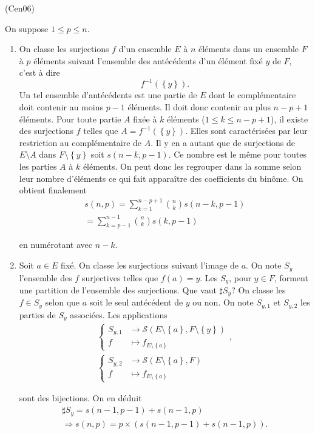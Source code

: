 \begin{tiny}(Cen06)\end{tiny} On suppose $1\leq p\leq n$. 
\begin{enumerate}
  \item On classe les surjections $f$ d'un ensemble $E$ à $n$ éléments dans un ensemble $F$ à $p$ éléments suivant l'ensemble des antécédents d'un élément fixé $y$ de $F$, c'est à dire 
\[
  f^{-1}(\left\lbrace y\right\rbrace).
\]
Un tel ensemble d'antécédents est une partie de $E$ dont le complémentaire doit contenir au moins $p-1$ éléments. Il doit donc contenir au plus $n-p+1$ éléments.\newline
Pour toute partie $A$ fixée à $k$ éléments ($1 \leq k\leq n-p+1$), il existe des surjections $f$ telles que $ A= f^{-1}(\left\lbrace y\right\rbrace)$. Elles sont caractérisées par leur restriction au complémentaire de $A$. Il y en a autant que de surjections de $E\setminus A$ dans $F\setminus\left\lbrace y \right\rbrace$ soit $s(n-k,p-1)$.\newline
Ce nombre est le même pour toutes les parties $A$ à $k$ éléments. On peut donc les regrouper dans la somme selon leur nombre d'éléments ce qui fait apparaître des coefficients du binôme. On obtient finalement
\begin{multline*}
  s(n,p) = \sum_{k=1}^{n-p+1}\binom{n}{k}s(n-k,p-1) \\
  = \sum_{k=p-1}^{n-1}\binom{n}{k}s(k,p-1)
\end{multline*}

en numérotant avec $n-k$.
  \item Soit $a \in E$ fixé. On classe les surjections suivant l'image de $a$. On note $S_y$ l'ensemble des $f$ surjectives telles que $f(a) = y$. Les $S_y$, pour $y\in F$, forment une partition de l'ensemble des surjections. Que vaut $\sharp S_y$?\medskip \newline
  On classe les $f \in S_y$ selon que $a$ soit le seul antécédent de $y$ ou non. On note $S_{y,1}$ et $S_{y,2}$ les parties de $S_y$ associées.\newline
  Les applications
\begin{multline*}
  \left\lbrace
  \begin{aligned}
    S_{y, 1} &\rightarrow \mathcal{S}(E\setminus \left\lbrace a \right\rbrace, F\setminus \left\lbrace y \right\rbrace)\\
    f &\mapsto f_{E\setminus \left\lbrace a \right\rbrace}
  \end{aligned}
   \right., \\
  \left\lbrace
  \begin{aligned}
    S_{y, 2} &\rightarrow \mathcal{S}(E\setminus \left\lbrace a \right\rbrace, F)\\
    f &\mapsto f_{E\setminus \left\lbrace a \right\rbrace}
  \end{aligned}
   \right.
\end{multline*}

sont des bijections. On en déduit 
\begin{multline*}
  \sharp S_y = s(n-1,p-1) + s(n-1,p)\\
  \Rightarrow s(n,p) = p \times\left(s(n-1,p-1) + s(n-1,p)\right).
\end{multline*}


\end{enumerate}


